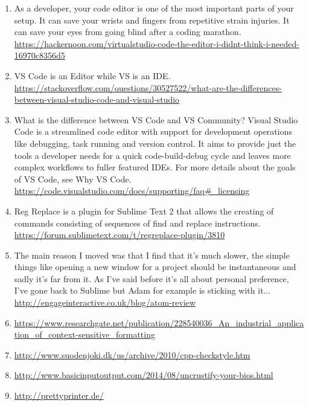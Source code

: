 \begin{englishtext}
\begin{sloppypar}
\begin{bluebox}
\begin{enumerate}[leftmargin=*,parsep=0pt]
    \item As a developer, your code editor is one of the most important parts of
    your setup. It can save your wrists and fingers from repetitive strain
    injuries. It can save your eyes from going blind after a coding marathon.
    \url{https://hackernoon.com/virtualstudio-code-the-editor-i-didnt-think-i-needed-16970c8356d5}

    \item VS Code is an Editor while VS is an IDE.
    \url{https://stackoverflow.com/questions/30527522/what-are-the-differences-between-visual-studio-code-and-visual-studio}

    \item What is the difference between VS Code and VS Community?
    Visual Studio Code is a streamlined code editor with support for development operations like
    debugging, task running and version control. It aims to provide just the tools a developer needs
    for a quick code-build-debug cycle and leaves more complex workflows to fuller featured IDEs.
    For more details about the goals of VS Code, see Why VS Code.
    \url{https://code.visualstudio.com/docs/supporting/faq#_licensing}

    \item Reg Replace is a plugin for Sublime Text 2 that allows the creating of commands consisting of
    sequences of find and replace instructions.
    \url{https://forum.sublimetext.com/t/regreplace-plugin/3810}

    \item The main reason I moved was that I find that it’s much slower, the simple things like opening a
    new window for a project should be instantaneous and sadly it’s far from it. As I've said before
    it's all about personal preference, I've gone back to Sublime but Adam for example is sticking
    with it...
    \url{http://engageinteractive.co.uk/blog/atom-review}

    \item \url{https://www.researchgate.net/publication/228540036_An_industrial_application_of_context-sensitive_formatting}

    \item \url{http://www.suodenjoki.dk/us/archive/2010/cpp-checkstyle.htm}

    \item \url{http://www.basicinputoutput.com/2014/08/uncrustify-your-bios.html}

    \item \url{http://prettyprinter.de/}


\end{enumerate}
\end{bluebox}
\end{sloppypar}
\end{englishtext}
